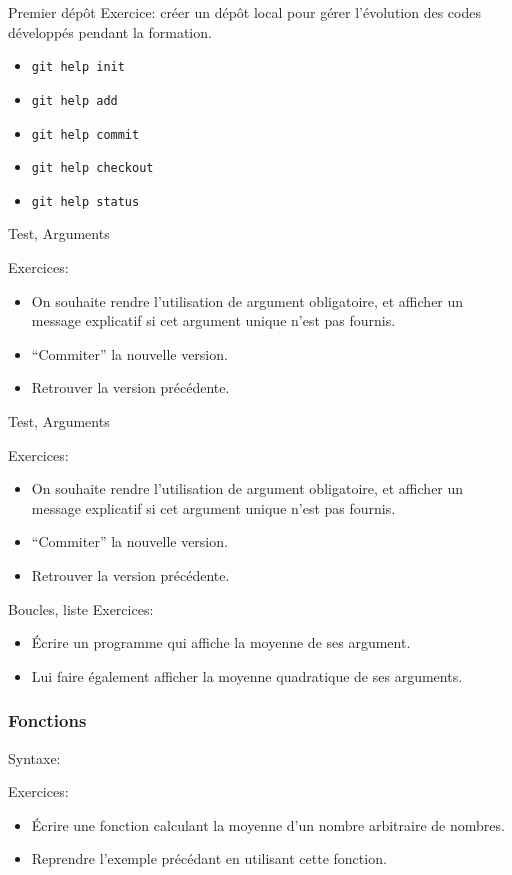 \documentclass{beamer}
\begin{document}
\begin{frame}{Premier dépôt}
  Exercice: créer un dépôt local pour gérer l'évolution des codes développés pendant la formation.
  \begin{itemize}
  \item {\tt git help init}
  \item {\tt git help add}
  \item {\tt git help commit}
  \item {\tt git help checkout}
  \item {\tt git help status}
  \end{itemize}
\end{frame}

\begin{frame}{Test, Arguments}
  
  Exercices:
  \begin{itemize}
  \item On souhaite rendre l'utilisation de argument obligatoire, et afficher un message explicatif si cet argument unique n'est pas fournis.
  \item ``Commiter''  la nouvelle version.
  \item Retrouver la version précédente.
  \end{itemize}
\end{frame}

\begin{frame}{Test, Arguments}
  
  Exercices:
  \begin{itemize}
  \item On souhaite rendre l'utilisation de argument obligatoire, et afficher un message explicatif si cet argument unique n'est pas fournis.
  \item ``Commiter''  la nouvelle version.
  \item Retrouver la version précédente.
  \end{itemize}
\end{frame}

\begin{frame}{Boucles, liste}
  Exercices:
  \begin{itemize}
  \item Écrire un programme qui affiche la moyenne de ses argument.
  \item Lui faire également afficher la moyenne quadratique de ses arguments.
  \end{itemize}
\end{frame}

\begin{frame}[fragile]\frametitle{Fonctions}
  Syntaxe:
  \fbox{}

  Exercices:
  \begin{itemize}
  \item Écrire une fonction calculant la moyenne d'un nombre arbitraire de nombres.
  \item Reprendre l'exemple précédant en utilisant cette fonction.
  \end{itemize}
\end{frame}
\end{document}
